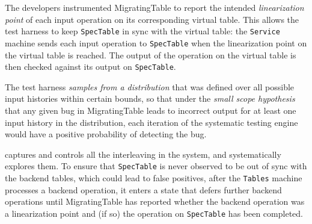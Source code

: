 The developers instrumented MigratingTable to report the intended \emph{linearization point} of each input operation on its corresponding virtual table. This allows the \psharp test harness to keep \texttt{SpecTable} in sync with the virtual table: the \texttt{Service} machine sends each input operation to \texttt{SpecTable} when the linearization point on the virtual table is reached. The output of the operation on the virtual table is then checked against its output on \texttt{SpecTable}.

The \psharp test harness \emph{samples from a distribution} that was defined over all possible input histories within certain bounds, so that under the \emph{small scope hypothesis} that any given bug in MigratingTable leads to incorrect output for at least one input history in the distribution, each iteration of the \psharp systematic testing engine would have a positive probability of detecting the bug.

\psharp captures and controls all the interleaving in the system, and systematically explores them. To ensure that \texttt{SpecTable} is never observed to be out of sync with the backend tables, which could lead to false positives, after the \texttt{Tables} machine processes a backend operation, it enters a state that defers further backend operations until MigratingTable has reported whether the backend operation was a linearization point and (if so) the operation on \texttt{SpecTable} has been completed.



